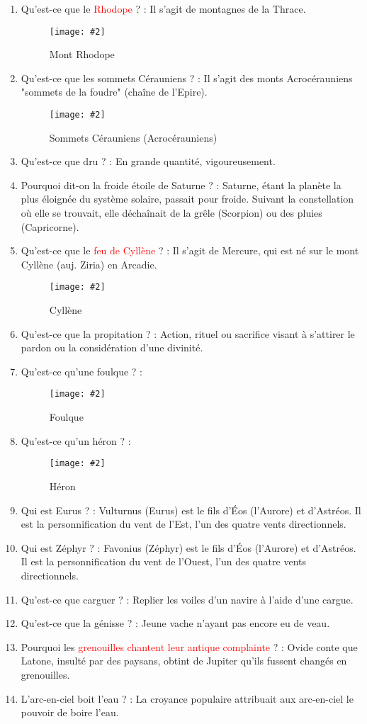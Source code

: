 \documentclass[a4paper, 11pt, hidelinks]{article}
\newcommand{\img}[4]{\begin{figure}[!ht]
    \centering
    \texttt{[image: \#2]}
    \caption{#3}
    \label{#4}
    \end{figure} }
\begin{document}
\begin{enumerate}
            \img{0.35}{Athos.png}{Mont Athos}{40}
      \item Qu'est-ce que le \textcolor{red}{Rhodope} ? : Il s'agit de montagnes de la Thrace.
            \img{0.4}{Rhodope.png}{Mont Rhodope}{41}
      \item Qu'est-ce que les sommets Cérauniens ? : Il s'agit des monts Acrocérauniens "sommets de la foudre" (chaîne de l'Epire).
            \img{0.4}{Acrocérauniens.png}{Sommets Cérauniens (Acrocérauniens)}{42}
      \item Qu'est-ce que dru ? : En grande quantité, vigoureusement.
      \item Pourquoi dit-on la froide étoile de Saturne ? : Saturne, étant la planète la plus éloignée du système solaire, passait
            pour froide. Suivant la constellation où elle se trouvait, elle déchaînait de la grêle (Scorpion) ou des pluies (Capricorne).
      \item Qu'est-ce que le \textcolor{red}{feu de Cyllène} ? : Il s'agit de Mercure, qui est né sur le mont Cyllène (auj. Ziria) en Arcadie.
            \img{0.3}{Cyllène.png}{Cyllène}{43}
      \item Qu'est-ce que la propitation ? : Action, rituel ou sacrifice visant à s'attirer le pardon ou la considération d'une divinité.
      \item Qu'est-ce qu'une foulque ? :
            \img{0.5}{Foulque.jpg}{Foulque}{44}
      \item Qu'est-ce qu'un héron ? : \img{0.5}{Héron.jpg}{Héron}{45}
      \item Qui est Eurus ? : Vulturnus (Eurus) est le fils d'Éos (l'Aurore) et d'Astréos. Il est la personnification du vent de l'Est,
            l'un des quatre vents directionnels.
      \item Qui est Zéphyr ? : Favonius (Zéphyr) est le fils d'Éos (l'Aurore) et d'Astréos. Il est la personnification du vent de l'Ouest,
            l'un des quatre vents directionnels.
      \item Qu'est-ce que carguer ? : Replier les voiles d'un navire à l'aide d'une cargue.
      \item Qu'est-ce que la génisse ? : Jeune vache n'ayant pas encore eu de veau.
      \item Pourquoi les \textcolor{red}{grenouilles chantent leur antique complainte} ? : Ovide conte que Latone, insulté par des paysans, obtint de Jupiter
            qu'ils fussent changés en grenouilles.
      \item L'arc-en-ciel boit l'eau ? : La croyance populaire attribuait aux arc-en-ciel le pouvoir de boire l'eau.

\end{enumerate}
\end{document}
